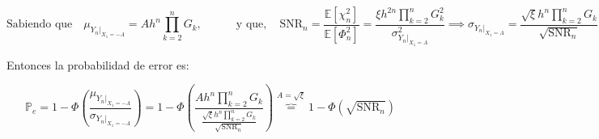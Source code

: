 \documentclass[11pt]{article}
\begin{document}
\[\text{Sabiendo que}\quad \mu_{{Y_{n}|}_{X_1 = -A}} = A h^{n} \prod_{k=2}^{n} G_{k},\quad\quad\quad \text{y que}, \quad \text{SNR}_n = \frac{\mathbb{E}[\chi_{n}^{2}]}{\mathbb{E}[\Phi_{n}^{2}]} = \frac{\xi h^{2n} \prod_{k=2}^{n} G_{k}^{2}}{\sigma^{2}_{{Y_{n}|}_{X_1 = A}}} \implies \sigma_{{Y_{n}|}_{X_1 = A}} = \frac{\sqrt{\xi} h^{n} \prod_{k=2}^{n} G_{k}}{\sqrt{\text{SNR}_n}}\]

Entonces la probabilidad de error es:

\[ \mathbb{P}_{e} = 1-\Phi\left(\frac{\mu_{{Y_{n}|}_{X_1 = -A}}}{\sigma_{{{Y_{n}|}_{X_1 = -A}}}}\right) = 1 - \Phi\left( \frac{A h^{n} \prod_{k=2}^{n} G_{k}}{\frac{\sqrt{\xi} h^{n} \prod_{k=2}^{n} G_{k}}{\sqrt{\text{SNR}_n}}}\right) \overbrace{=}^{A = \sqrt{\xi}} 1-\Phi\left(\sqrt{\text{SNR}_n}\right)\]

    
\end{document}
